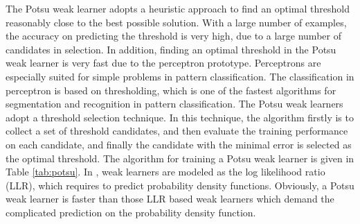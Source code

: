 \documentclass[a4paper,10pt]{article}
\begin{document}
The Potsu weak learner adopts a heuristic approach to find an optimal threshold reasonably close to the best possible solution. With a large number of examples, the accuracy on predicting the threshold is very high, due to a large number of candidates in selection. In addition, finding an optimal threshold in the Potsu weak learner is very fast due to the perceptron prototype. Perceptrons are especially suited for simple problems in pattern classification. The classification in perceptron is based on thresholding, which is one of the fastest algorithms for segmentation and recognition in pattern classification. The Potsu weak learners adopt a threshold selection technique. In this technique, the algorithm firstly is to collect a set of threshold candidates, and then evaluate the training performance on each candidate, and finally the candidate with the minimal error is selected as the optimal threshold.
The algorithm for training a Potsu weak learner is given in \mbox{Table} \ref{tab:potsu}. In \cite{Friedman2000,LiStan2004,Schapire1998}, weak learners are modeled as the log likelihood ratio (LLR), which requires to predict probability density functions. Obviously, a Potsu weak learner is faster than those LLR based weak learners which demand the complicated prediction on the probability density function.
\end{document}
